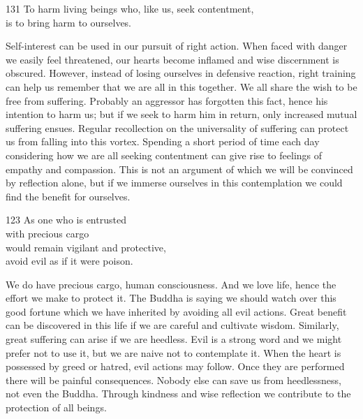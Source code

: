 
\begin{dhpVerse}{131}
\label{dhp-131}
To harm living beings who, like us, seek contentment,\\
is to bring harm to ourselves.
\end{dhpVerse}

\begin{dhpRefl}
  Self-interest can be used in our pursuit of right action. When faced with
  danger we easily feel threatened, our hearts become inflamed and wise
  discernment is obscured. However, instead of losing ourselves in defensive
  reaction, right training can help us remember that we are all in this
  together. We all share the wish to be free from suffering. Probably an
  aggressor has forgotten this fact, hence his intention to harm us; but if we
  seek to harm him in return, only increased mutual suffering ensues. Regular
  recollection on the universality of suffering can protect us from falling into
  this vortex. Spending a short period of time each day considering how we are
  all seeking contentment can give rise to feelings of empathy and compassion.
  This is not an argument of which we will be convinced by reflection alone, but
  if we immerse ourselves in this contemplation we could find the benefit for
  ourselves.
\end{dhpRefl}


\begin{dhpVerse}{123}
\label{dhp-123}
As one who is entrusted\\
with precious cargo\\
would remain vigilant and protective,\\
avoid evil as if it were poison.
\end{dhpVerse}

\begin{dhpRefl}
  We do have precious cargo, human consciousness. And we love life, hence the
  effort we make to protect it. The Buddha is saying we should watch over this
  good fortune which we have inherited by avoiding all evil actions. Great
  benefit can be discovered in this life if we are careful and cultivate wisdom.
  Similarly, great suffering can arise if we are heedless. Evil is a strong word
  and we might prefer not to use it, but we are naive not to contemplate it.
  When the heart is possessed by greed or hatred, evil actions may follow. Once
  they are performed there will be painful consequences. Nobody else can save us
  from heedlessness, not even the Buddha. Through kindness and wise reflection
  we contribute to the protection of all beings.
\end{dhpRefl}

